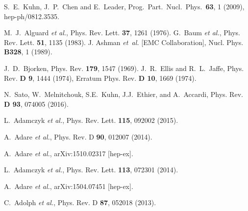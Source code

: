 \documentclass[12pt]{report}
\begin{document}
%
\begin{thebibliography}{99}

  S.~E.~Kuhn, J.~P.~Chen and E.~Leader,
Prog.\ Part.\ Nucl.\ Phys.\  {\bf 63}, 1 (2009), hep-ph/0812.3535.

  M.~J.~Alguard {\it et al.},
  Phys. Rev. Lett. {\bf 37}, 1261 (1976).
 G.~Baum {\it et al.},
  Phys. Rev. Lett. {\bf 51}, 1135 (1983). 
J. Ashman {\it et~al.} [EMC Collaboration],
Nucl. Phys. {\bf B328}, 1 (1989).

  J.~D.~Bjorken,
  Phys. Rev. {\bf 179}, 1547 (1969). 
  J.~R.~Ellis and R.~L.~Jaffe,
  Phys. Rev. {\bf D 9}, 1444 (1974), Erratum Phys. Rev. {\bf D 10}, 1669 (1974).
 
 N.~Sato, W.~Melnitchouk, S.E.~Kuhn, J.J.~Ethier, and A.~Accardi,
 Phys. Rev. {\bf D 93}, 074005 (2016). 

L.~Adamczyk {\it et al.}, %
Phys. Rev. Lett. {\bf 115}, 092002 (2015).

A.~Adare {\it et al.}, %
Phys. Rev. D {\bf 90}, 012007 (2014).

A.~Adare {\it et al.}, %
arXiv:1510.02317 [hep-ex].

L.~Adamczyk {\it et al.}, %
Phys. Rev. Lett. {\bf 113}, 072301 (2014).

A.~Adare {\it et al.}, %
arXiv:1504.07451 [hep-ex].

C.~Adolph {\it et al.}, %
Phys. Rev. D {\bf 87}, 052018 (2013).


\end{thebibliography}
\end{document}
